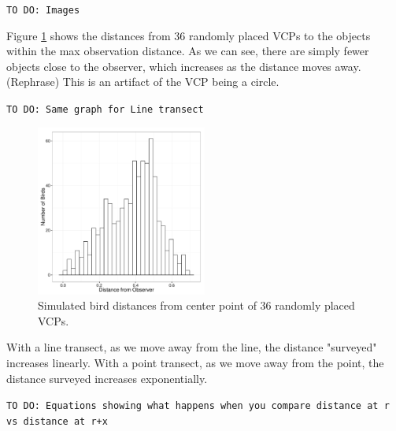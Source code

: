 \documentclass[12pt]{article}
\begin{document}
\texttt{TO DO: Images}

Figure \ref{fig:simDist} shows the distances from 36 randomly placed VCPs to the objects within the max observation distance. As we can see, there are simply fewer objects close to the observer, which increases as the distance moves away. (Rephrase) This is an artifact of the VCP being a circle. 

\texttt{TO DO: Same graph for Line transect}

\begin{figure}
	\center
	\includegraphics[width=0.5\textwidth]{../images/simulated_bird_distances.pdf}
	\caption{Simulated bird distances from center point of 36 randomly placed VCPs.\label{fig:simDist}}
		
\end{figure}

With a line transect, as we move away from the line, the distance "surveyed" increases linearly. With a point transect, as we move away from the point, the distance surveyed increases exponentially. 

\texttt{TO DO: Equations showing what happens when you compare distance at r vs distance at r+x}
\end{document}
